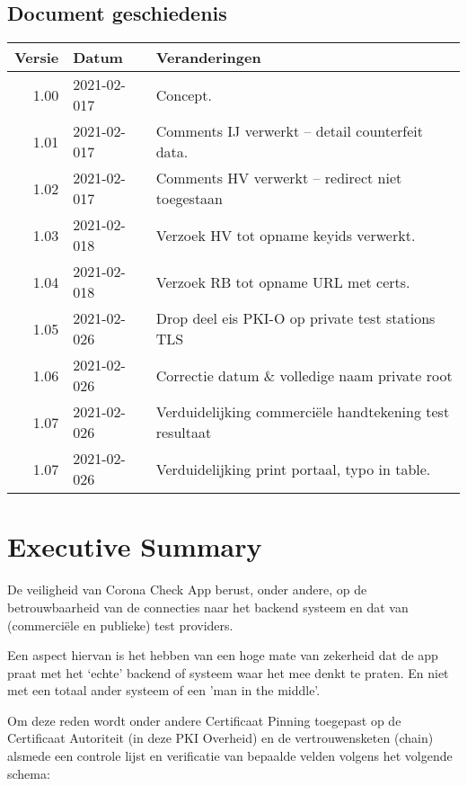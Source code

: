 \documentclass[11.0pt,twoside,openright]{report}
\begin{document}

\maketitle

\section*{Document geschiedenis}

\begin{tabular}{|r|l|l|}
\hline
Versie & Datum & Veranderingen \\
\hline
\hline
1.00 & 2021-02-017 & Concept. \\
\hline
1.01 & 2021-02-017 & Comments IJ verwerkt -- detail counterfeit data.\\
\hline
1.02 & 2021-02-017 & Comments HV verwerkt -- redirect niet toegestaan \\
\hline
1.03 & 2021-02-018 & Verzoek HV tot opname keyids verwerkt.  \\
\hline
1.04 & 2021-02-018 & Verzoek RB tot opname URL met certs.  \\
\hline
1.05 & 2021-02-026 & Drop deel eis PKI-O op private test stations TLS \\
\hline
1.06 & 2021-02-026 & Correctie datum \& volledige naam private root \\
\hline
1.07 & 2021-02-026 & Verduidelijking commerciële handtekening test resultaat \\
\hline
1.07 & 2021-02-026 & Verduidelijking print portaal, typo in table. \\
\hline
\end{tabular}


\pagebreak
\chapter{Executive Summary}

De veiligheid van Corona Check App berust, onder andere, op de betrouwbaarheid van de connecties naar het backend systeem en dat van (commerciële en publieke) test providers.

Een aspect hiervan is het hebben van een hoge mate van zekerheid dat de app praat met het `echte' backend of systeem waar het mee denkt te praten. En niet met een totaal ander systeem of een 'man in the middle'.

Om deze reden wordt onder andere Certificaat Pinning toegepast op de Certificaat Autoriteit (in deze PKI Overheid) en de vertrouwensketen (chain) alsmede een controle lijst en verificatie van bepaalde velden volgens het volgende schema:
\end{document}
